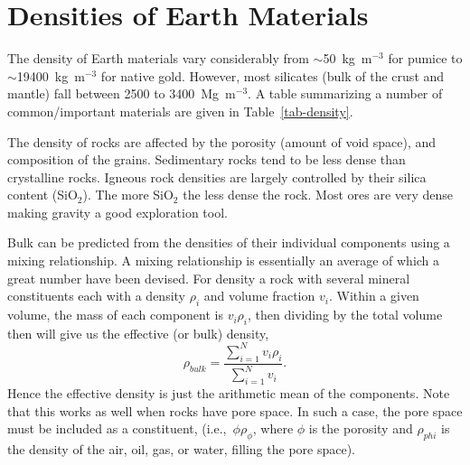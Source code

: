 
\section{Densities of Earth Materials}
The density of Earth materials vary considerably from $\sim$50~kg~m$^{-3}$ for pumice to $\sim$19400~kg~m$^{-3}$ for native gold.  However, most silicates (bulk of the crust and mantle) fall between 2500 to 3400~Mg~m$^{-3}$.  A table summarizing a number of common/important materials are given in Table~\ref{tab-density}.

The density of rocks are affected by the porosity (amount of void space), and composition of the grains.  Sedimentary rocks tend to be less dense than crystalline rocks.  Igneous rock densities are largely controlled by their silica content (SiO$_{2}$).  The more SiO$_{2}$ the less dense the rock.  Most ores are very dense making gravity a good exploration tool.

Bulk can be predicted from the densities of their individual components using a mixing relationship.  A mixing relationship is essentially an average of which a great number have been devised.  For density a rock with several mineral constituents each with a density $\rho_{i}$ and volume fraction $v_{i}$.  Within a given volume, the mass of each component is $v_{i} \rho_{i}$, then dividing by the total volume then will give us the effective (or bulk) density,
\begin{equation}
    \rho_{bulk} = \frac{\sum_{i=1}^{N} v_{i} \rho_{i}}{\sum_{i=1}^{N} v_{i}}.
\end{equation}
Hence the effective density is just the arithmetic mean of the components.  Note that this works as well when rocks have pore space.  In such a case, the pore space must be included as a constituent, (i.e.,\ $\phi \rho_{\phi}$, where $\phi$ is the porosity and $\rho_{phi}$ is the density of the air, oil, gas, or water, filling the pore space).


\nocite{Blakely1995}
\nocite{Chapin1998}
\nocite{Grant&West1965}
\nocite{Lowrie1997}
\nocite{Reynolds1997}
\nocite{Telford_etal1990}



